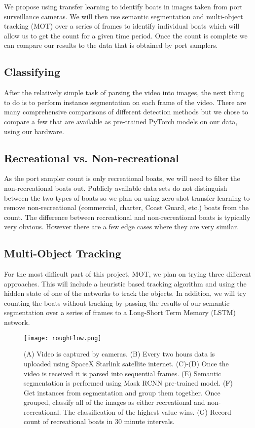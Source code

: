 \documentclass[10pt,twocolumn,letterpaper]{article}
\begin{document}
We propose using transfer learning to identify boats in images taken from port surveillance cameras. We will then use semantic segmentation and multi-object tracking (MOT) over a series of frames to identify individual boats which will allow us to get the count for a given time period. Once the count is complete we can compare our results to the data that is obtained by port samplers.

\subsection{Classifying}

After the relatively simple task of parsing the video into images, the next thing to do is to perform instance segmentation on each frame of the video. There are many comprehensive comparisons of different detection methods \cite{pytorch_models} but we chose to compare a few that are available as pre-trained PyTorch models on our data, using our hardware.

\subsection{Recreational vs. Non-recreational}

 As the port sampler count is only recreational boats, we will need to filter the non-recreational boats out. Publicly available data sets do not distinguish between the two types of boats so we plan on using zero-shot transfer learning to remove non-recreational (commercial, charter, Coast Guard, etc.) boats from the count. The difference between recreational and non-recreational boats is typically very obvious. However there are a few edge cases where they are very similar.

\subsection{Multi-Object Tracking}

For the most difficult part of this project, MOT, we plan on trying three different approaches. This will include a heuristic based tracking algorithm and using the hidden state of one of the networks to track the objects. In addition, we will try counting the boats without tracking by passing the results of our semantic segmentation over a series of frames to a Long-Short Term Memory (LSTM) network.

\begin{figure*}[t]
  \centering
    \texttt{[image: roughFlow.png]}
    \caption{(A) Video is captured by cameras. (B) Every two hours data is uploaded using SpaceX Starlink satellite internet. (C)-(D) Once the video is received it is parsed into sequential frames. (E) Semantic segmentation is performed using Mask RCNN pre-trained model. (F) Get instances from segmentation and group them together. Once grouped, classify all of the images as either recreational and non-recreational. The classification of the highest value wins. (G) Record count of recreational boats in 30 minute intervals.}
    \label{fig:pipline}
  \hfill
\end{figure*}
\end{document}
